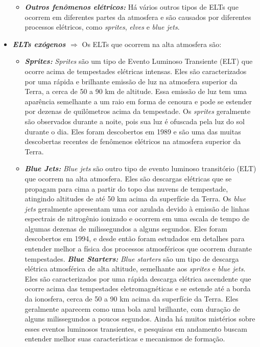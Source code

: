 \documentclass[a4paper, 12pt, onecolumn,singlespacing]{article}
\begin{document}
\begin{itemize}
\begin{itemize}
			\item \textbf{\textit{Outros fenômenos elétricos:}} Há vários outros tipos de ELTs que ocorrem em diferentes partes da atmosfera e são causados por diferentes processos elétricos, como \textit{sprites}, \textit{elves} e \textit{blue jets}.
		\end{itemize}
		\item \textbf{\textit{ELTs exógenos $\Rightarrow$ }} Os ELTs que ocorrem na alta atmosfera são:
		\begin{itemize}
			\item \textbf{\textit{Sprites: }} \textit{Sprites} são um tipo de Evento Luminoso Transiente (ELT) que ocorre acima de tempestades elétricas intensas. Eles são caracterizados por uma rápida e brilhante emissão de luz na atmosfera superior da Terra, a cerca de 50 a 90 km de altitude. Essa emissão de luz tem uma aparência semelhante a um raio em forma de cenoura e pode se estender por dezenas de quilômetros acima da tempestade. Os \textit{sprites} geralmente são observados durante a noite, pois sua luz é ofuscada pela luz do sol durante o dia. Eles foram descobertos em 1989 e são uma das muitas descobertas recentes de fenômenos elétricos na atmosfera superior da Terra.
			\item \textbf{\textit{Blue Jets: }}\textit{Blue jets} são outro tipo de evento luminoso transitório (ELT) que ocorrem na alta atmosfera. Eles são descargas elétricas que se propagam para cima a partir do topo das nuvens de tempestade, atingindo altitudes de até 50 km acima da superfície da Terra. Os \textit{blue jets} geralmente apresentam uma cor azulada devido à emissão de linhas espectrais de nitrogênio ionizado e ocorrem em uma escala de tempo de algumas dezenas de milissegundos a alguns segundos. Eles foram descobertos em 1994, e desde então foram estudados em detalhes para entender melhor a física dos processos atmosféricos que ocorrem durante tempestades.
			\subitem \textbf{\textit{Blue Starters: }}\textit{Blue starters} são um tipo de descarga elétrica atmosférica de alta altitude, semelhante aos \textit{sprites} e \textit{blue jets}. Eles são caracterizados por uma rápida descarga elétrica ascendente que ocorre acima das tempestades eletromagnéticas e se estende até a borda da ionosfera, cerca de 50 a 90 km acima da superfície da Terra. Eles geralmente aparecem como uma bola azul brilhante, com duração de alguns milissegundos a poucos segundos. Ainda há muitos mistérios sobre esses eventos luminosos transientes, e pesquisas em andamento buscam entender melhor suas características e mecanismos de formação.

\end{itemize}
\end{itemize}
\end{document}
